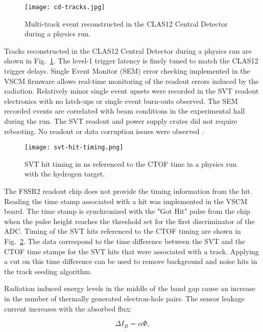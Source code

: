 \begin{figure}[h] 
\centering 
\texttt{[image: cd-tracks.jpg]}
\caption{Multi-track event reconstructed in the CLAS12 Central Detector during a physics run.}
\label{fig:cd-tracks}
\end{figure}

Tracks reconstructed in the CLAS12 Central Detector during a physics run are shown in Fig.~\ref{fig:cd-tracks}. The level-1 trigger latency is finely tuned to match the CLAS12 trigger delays. Single Event Monitor (SEM) error checking implemented in the VSCM firmware allows real-time monitoring of the readout errors induced by the radiation. Relatively minor single event upsets were recorded in the SVT readout electronics with no latch-ups or single event burn-outs observed. The SEM recorded events are correlated with beam conditions in the experimental hall during the run. The SVT readout and power supply crates did not require rebooting. No readout or data corruption issues were observed \cite{SEENOTE}. 

\begin{figure}[htb] 
\centering 
\texttt{[image: svt-hit-timing.png]}
\caption{SVT hit timing in ns referenced to the CTOF time in a physics run with the hydrogen target.}
\label{fig:svt-hit-timing}
\end{figure}

The FSSR2 readout chip does not provide the timing information from the hit. Reading the time stamp associated with a hit was implemented in the VSCM board. The time stamp is synchronized with the "Got Hit" pulse from the chip when the pulse height reaches the threshold set for the first discriminator of the ADC. Timing of the SVT hits referenced to the CTOF timing are shown in Fig.~\ref{fig:svt-hit-timing}. The data correspond to the time difference between the SVT and the CTOF time stamps for the SVT hits that were associated with a track. Applying a cut on this time difference can be  used to remove background and noise hits in the track seeding algorithm.

Radiation induced energy levels in the middle of the band gap cause an increase in the number of thermally generated electron-hole pairs. The sensor leakage current increases with the absorbed flux:

\begin{equation} \Delta I_R = \alpha \Phi \label{eq:leakage-fluence},
\end{equation}

